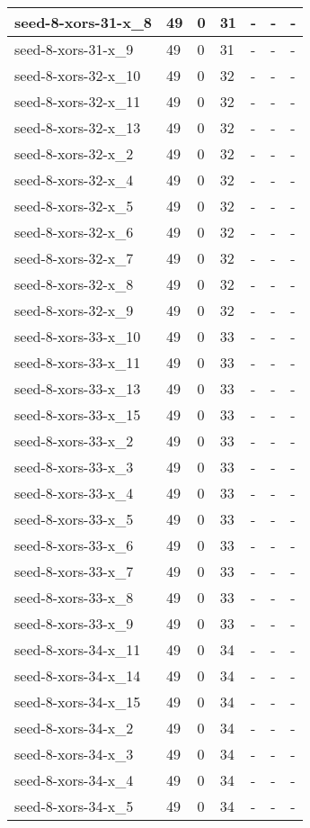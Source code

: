 \begin{scriptsize}
\begin{longtable}{|p{5cm}|l|l|l|l|l|l|}
seed-8-xors-31-x\_8&49&0&31&-&-&- \\ \hline 
seed-8-xors-31-x\_9&49&0&31&-&-&- \\ \hline 
seed-8-xors-32-x\_10&49&0&32&-&-&- \\ \hline 
seed-8-xors-32-x\_11&49&0&32&-&-&- \\ \hline 
seed-8-xors-32-x\_13&49&0&32&-&-&- \\ \hline 
seed-8-xors-32-x\_2&49&0&32&-&-&- \\ \hline 
seed-8-xors-32-x\_4&49&0&32&-&-&- \\ \hline 
seed-8-xors-32-x\_5&49&0&32&-&-&- \\ \hline 
seed-8-xors-32-x\_6&49&0&32&-&-&- \\ \hline 
seed-8-xors-32-x\_7&49&0&32&-&-&- \\ \hline 
seed-8-xors-32-x\_8&49&0&32&-&-&- \\ \hline 
seed-8-xors-32-x\_9&49&0&32&-&-&- \\ \hline 
seed-8-xors-33-x\_10&49&0&33&-&-&- \\ \hline 
seed-8-xors-33-x\_11&49&0&33&-&-&- \\ \hline 
seed-8-xors-33-x\_13&49&0&33&-&-&- \\ \hline 
seed-8-xors-33-x\_15&49&0&33&-&-&- \\ \hline 
seed-8-xors-33-x\_2&49&0&33&-&-&- \\ \hline 
seed-8-xors-33-x\_3&49&0&33&-&-&- \\ \hline 
seed-8-xors-33-x\_4&49&0&33&-&-&- \\ \hline 
seed-8-xors-33-x\_5&49&0&33&-&-&- \\ \hline 
seed-8-xors-33-x\_6&49&0&33&-&-&- \\ \hline 
seed-8-xors-33-x\_7&49&0&33&-&-&- \\ \hline 
seed-8-xors-33-x\_8&49&0&33&-&-&- \\ \hline 
seed-8-xors-33-x\_9&49&0&33&-&-&- \\ \hline 
seed-8-xors-34-x\_11&49&0&34&-&-&- \\ \hline 
seed-8-xors-34-x\_14&49&0&34&-&-&- \\ \hline 
seed-8-xors-34-x\_15&49&0&34&-&-&- \\ \hline 
seed-8-xors-34-x\_2&49&0&34&-&-&- \\ \hline 
seed-8-xors-34-x\_3&49&0&34&-&-&- \\ \hline 
seed-8-xors-34-x\_4&49&0&34&-&-&- \\ \hline 
seed-8-xors-34-x\_5&49&0&34&-&-&- \\ \hline 

\end{longtable}
\end{scriptsize}
